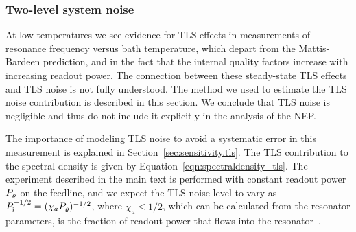 \subsubsection{Two-level system noise}

At low temperatures we see evidence for TLS effects in measurements of resonance frequency versus bath temperature, which depart from the Mattis-Bardeen prediction, and in the fact that the internal quality factors increase with increasing readout power.
The connection between these steady-state TLS effects and TLS noise is not fully understood.
The method we used to estimate the TLS noise contribution is described in this section.
We conclude that TLS noise is negligible and thus do not include it explicitly in the analysis of the NEP.

The importance of modeling TLS noise to avoid a systematic error in this measurement is explained in Section~\ref{sec:sensitivity.tls}.
The TLS contribution to the spectral density is given by 
Equation~\ref{eqn:spectraldensity_tls}.
The experiment described in the main text is performed with constant readout power $P_\varrho$ on the feedline, and we expect the TLS noise level to vary as $P_{\mathrm{i}}^{-1/2} = (\chi_a P_\varrho)^{-1/2}$, where $\chi_a \le 1/2$, which can be calculated from the resonator parameters, is the fraction of readout power that flows into the resonator~\autocite{Zmuidzinas2012ARCMP}.

